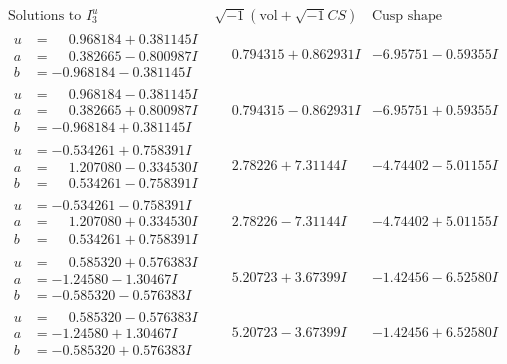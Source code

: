 \documentclass[1p]{elsarticle_modified}
\theoremstyle{definition}
\newcommand{\I}{\sqrt{-1}}
\begin{document}
$$\begin{array}{c|c|c}  
\text{Solutions to }I^u_{3}& \I (\text{vol} + \sqrt{-1}CS) & \text{Cusp shape}\\
 \hline 
\begin{aligned}
u &= \phantom{-}0.968184 + 0.381145 I \\
a &= \phantom{-}0.382665 - 0.800987 I \\
b &= -0.968184 - 0.381145 I\end{aligned}
 & \phantom{-}0.794315 + 0.862931 I & -6.95751 - 0.59355 I \\ \hline\begin{aligned}
u &= \phantom{-}0.968184 - 0.381145 I \\
a &= \phantom{-}0.382665 + 0.800987 I \\
b &= -0.968184 + 0.381145 I\end{aligned}
 & \phantom{-}0.794315 - 0.862931 I & -6.95751 + 0.59355 I \\ \hline\begin{aligned}
u &= -0.534261 + 0.758391 I \\
a &= \phantom{-}1.207080 - 0.334530 I \\
b &= \phantom{-}0.534261 - 0.758391 I\end{aligned}
 & \phantom{-}2.78226 + 7.31144 I & -4.74402 - 5.01155 I \\ \hline\begin{aligned}
u &= -0.534261 - 0.758391 I \\
a &= \phantom{-}1.207080 + 0.334530 I \\
b &= \phantom{-}0.534261 + 0.758391 I\end{aligned}
 & \phantom{-}2.78226 - 7.31144 I & -4.74402 + 5.01155 I \\ \hline\begin{aligned}
u &= \phantom{-}0.585320 + 0.576383 I \\
a &= -1.24580 - 1.30467 I \\
b &= -0.585320 - 0.576383 I\end{aligned}
 & \phantom{-}5.20723 + 3.67399 I & -1.42456 - 6.52580 I \\ \hline\begin{aligned}
u &= \phantom{-}0.585320 - 0.576383 I \\
a &= -1.24580 + 1.30467 I \\
b &= -0.585320 + 0.576383 I\end{aligned}
 & \phantom{-}5.20723 - 3.67399 I & -1.42456 + 6.52580 I \\ \hline\begin{aligned}

\end{aligned}
\end{array}$$
\end{document}
